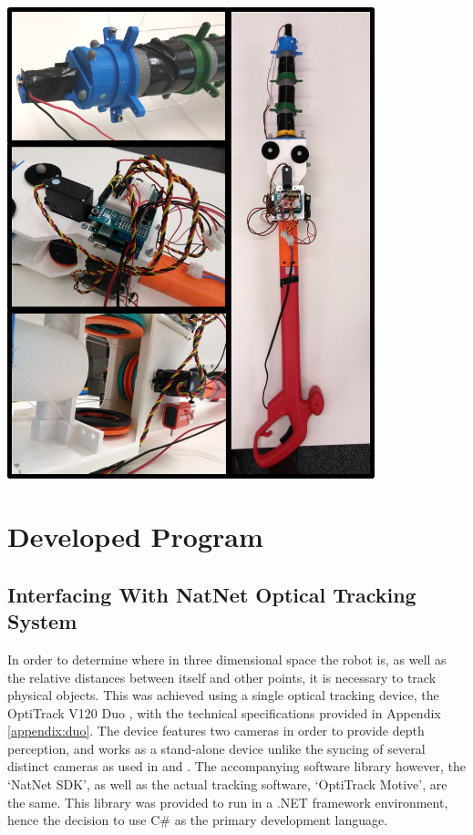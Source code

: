 \documentclass[11pt]{article}
\begin{document}
\begin{center}
\includegraphics[width=0.8\textwidth]{images/fullDevice.png}
\label{figure:fullDevice}
\end{center}

\pagebreak
\section{Developed Program}

\subsection{Interfacing With NatNet Optical Tracking System}
\label{section:natnet}
In order to determine where in three dimensional space the robot is, as well as the relative distances between itself and other points, it is necessary to track physical objects. This was achieved using a single optical tracking device, the OptiTrack V120 Duo \cite{OptiTrackSite}, with the technical specifications provided in Appendix \ref{appendix:duo}. The device features two cameras in order to provide depth perception, and works as a stand-alone device unlike the syncing of several distinct cameras as used in \cite{GreggSmithDesign} and \cite{GreggSmithFeedback}. The accompanying software library however, the `NatNet SDK', as well as the actual tracking software, `OptiTrack Motive', are the same. This library was provided to run in a .NET framework environment, hence the decision to use C\# as the primary development language.
\end{document}
